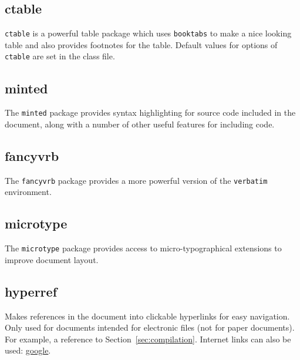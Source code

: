\documentclass[electronic,timesopt,headers]{adharticle} %
\begin{document}
\subsection{ctable}

\texttt{ctable} is a powerful table package which uses \texttt{booktabs} to make
a nice looking table and also provides footnotes for the table. Default values
for options of \texttt{ctable} are set in the class file.

\subsection{minted}

The \texttt{minted} package provides syntax highlighting for source code
included in the document, along with a number of other useful features for
including code.

\subsection{fancyvrb}

The \texttt{fancyvrb} package provides a more powerful version of the
\texttt{verbatim} environment.

\subsection{microtype}

The \texttt{microtype} package provides access to micro-typographical extensions
to improve document layout.

\subsection{hyperref}

Makes references in the document into clickable hyperlinks for easy
navigation. Only used for documents intended for electronic files (not for paper
documents). For example, a reference to Section~\ref{sec:compilation}. Internet
links can also be used: \href{http://www.google.co.uk}{google}.
\end{document}
